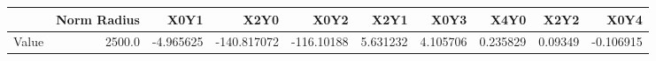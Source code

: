 \documentclass[convert={convertexe={magick.exe}, density={150}}]{standalone}
\begin{document}
\begin{tabular}{lrrrrrrrrr}
\toprule
{} &  Norm Radius &      X0Y1 &        X2Y0 &       X0Y2 &      X2Y1 &      X0Y3 &      X4Y0 &     X2Y2 &      X0Y4 \\
\midrule
Value &       2500.0 & -4.965625 & -140.817072 & -116.10188 &  5.631232 &  4.105706 &  0.235829 &  0.09349 & -0.106915 \\
\bottomrule
\end{tabular}
\end{document}
